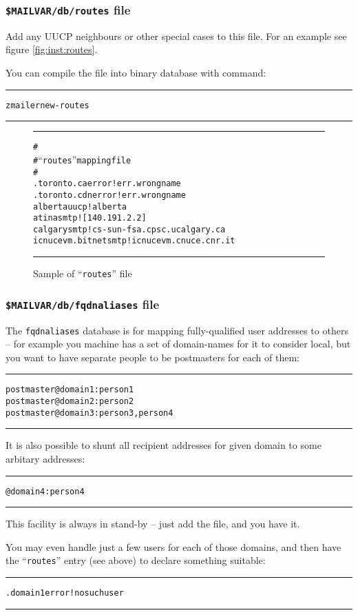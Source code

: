 \begin{multicols}{2}
\subsubsection{{\tt \$MAILVAR/db/routes} file}

Add any UUCP neighbours or other special cases to this file.
For an example see figure \vref{fig:inst:routes}.

You can compile the file into binary database with command:
\begin{alltt}\medskip\hrule\medskip
  zmailer new-routes
\medskip\hrule\medskip\end{alltt}

\begin{figure*}
\begin{alltt}\hrule\medskip
#
# ``routes'' mapping file
#
.toronto.ca      error!err.wrongname
.toronto.cdn     error!err.wrongname
alberta          uucp!alberta
atina            smtp![140.191.2.2]
calgary          smtp!cs-sun-fsa.cpsc.ucalgary.ca
icnucevm.bitnet  smtp!icnucevm.cnuce.cnr.it
\medskip\hrule\end{alltt}\medskip
\caption{\label{fig:inst:routes}Sample of ``{\tt routes}'' file}
\end{figure*}

\subsubsection{{\tt \$MAILVAR/db/fqdnaliases} file}

The {\tt fqdnaliases} database is for mapping fully-qualified user
addresses to others -- for example you machine has a set of
domain-names for it to consider local, but you want to have
separate people to be postmasters for each of them:
\begin{alltt}\medskip\hrule\small\medskip
postmaster@domain1: person1
postmaster@domain2: person2
postmaster@domain3: person3, person4
\medskip\hrule\medskip\end{alltt}

It is also possible to shunt all recipient addresses for given domain
to some arbitary addresses:
\begin{alltt}\medskip\hrule\small\medskip
@domain4:  person4
\medskip\hrule\medskip\end{alltt}

This facility is always in stand-by -- just add the file, and
you have it.

You may even handle just a few users for each of those domains, and then
have the ``{\tt routes}'' entry (see above) to declare something suitable:
\begin{alltt}\medskip\hrule\small\medskip
.domain1  error!nosuchuser
\medskip\hrule\medskip\end{alltt}


\end{multicols}
